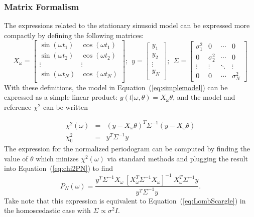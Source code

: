 \documentclass[12pt,preprint]{aastex}
\newcommand{\Eq}[1]{Equation~(\ref{eq:#1})}
\newcommand{\eq}[1]{\Eq{#1}}
\newcommand{\eqlabel}[1]{\label{eq:#1}}
\begin{document}
\subsubsection{Matrix Formalism}
The expressions related to the stationary sinusoid model can be expressed more compactly by defining the following matrices:
\begin{equation}
X_\omega = \left[
\begin{array}{cc}
\sin(\omega t_1) & \cos(\omega t_1)\\
\sin(\omega t_2) & \cos(\omega t_2)\\
\vdots & \vdots \\
\sin(\omega t_N) & \cos(\omega t_N)\\
\end{array}
\right];~~
y = \left[
\begin{array}{c}
y_1 \\
y_2\\
\vdots \\
y_N\\
\end{array}
\right];~~
\Sigma = \left[
\begin{array}{cccc}
\sigma_1^2 & 0 &  \cdots & 0\\
0 & \sigma_2^2 &  \cdots & 0\\
\vdots & \vdots &  \ddots & \vdots\\
0 & 0 &  \cdots & \sigma_N^2
\end{array}
\right]
\end{equation}
With these definitions, the model in \eq{simplemodel} can be expressed as a simple linear product: $y(t|\omega,\theta) = X_\omega\theta$, and the model and reference $\chi^2$ can be written

\begin{eqnarray}
  \chi^2(\omega) &=& (y - X_\omega\theta)^T\Sigma^{-1}(y - X_\omega\theta)\\
  \chi^2_0 &=& y^T \Sigma^{-1} y
\end{eqnarray}
The expression for the normalized periodogram can be computed by finding the value of $\theta$ which minizes $\chi^2(\omega)$ via standard methods and plugging the result into \eq{chi2PN} to find
\begin{equation}
  \eqlabel{LombScargle2}
  P_N(\omega) = \frac{y^T\Sigma^{-1}X_\omega~[X_\omega^T\Sigma^{-1}X_\omega]^{-1}~X_\omega^T\Sigma^{-1}y}{y^T\Sigma^{-1}y}.
\end{equation}
Take note that this expression is equivalent to \eq{LombScargle} in the homoscedastic case with $\Sigma \propto \sigma^2 I$.
\end{document}
